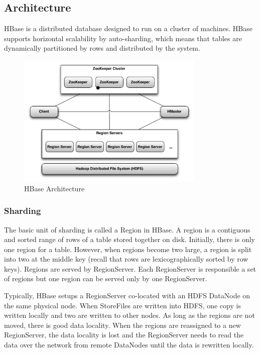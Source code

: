 \documentclass[11pt]{book}
\begin{document}
\subsection{Architecture}

HBase is a distributed database designed to run on a cluster of machines. HBase supports horizontal scalability by auto-sharding, which means that tables are dynamically partitioned by rows and distributed by the system. 

\begin{figure}[t]
\includegraphics[width=0.8\textwidth]{images/hbase-architecture.png}
\centering
\caption{HBase Architecture}
\end{figure}

\subsubsection{Sharding}

The basic unit of sharding is called a Region in HBase. A region is a contiguous and sorted range of rows of a table stored together on disk. Initially, there is only one region for a table. However, when regions become two large, a region is split into two at the middle key (recall that rows are lexicographically sorted by row keys). Regions are served by RegionServer. Each RegionServer is responsible a set of regions but one region can be served only by one RegionServer.

Typically, HBase setups a RegionServer co-located with an HDFS DataNode on the same physical node. When StoreFiles are written into HDFS, one copy is written locally and two are written to other nodes. As long as the regions are not moved, there is good data locality. When the regions are reassigned to a new RegionServer, the data locality is lost and the RegionServer needs to read the data over the network from remote DataNodes until the data is rewritten locally.
\end{document}
